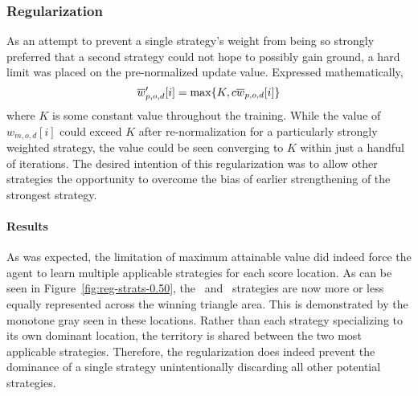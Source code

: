 

\subsubsection*{Regularization}


As an attempt to prevent a single strategy's weight from being so strongly 
preferred that a second strategy could not hope to possibly gain ground,
a hard limit was placed on the pre-normalized update value.
%
Expressed mathematically,
\[
    \overline{w}'_{p,o,d}[i] = \max\{K,c\overline{w}_{p,o,d}[i]\}
\]
where $K$ is some constant value throughout the training.
%
While the value of $w_{m,o,d}[i]$ could exceed $K$ after re-normalization
for a particularly strongly weighted strategy,
the value could be seen converging to $K$ within just a handful of iterations.
%
The desired intention of this regularization was to allow other strategies
the opportunity to overcome the bias of earlier strengthening of the strongest
strategy.

\paragraph*{Results}



%
%



As was expected,
the limitation of maximum attainable value did indeed force the agent to learn
multiple applicable strategies for each score location.
%
As can be seen in Figure~\ref{fig:reg-strats-0.50},
the \handmaxmin\ and \handmaxavg\ strategies are now 
more or less equally represented across the winning triangle area.
%
This is demonstrated by the monotone gray seen in these locations.
%
Rather than each strategy specializing to its own dominant location,
the territory is shared between the two most applicable strategies.
%
Therefore,
the regularization does indeed prevent the dominance of a single strategy
unintentionally discarding all other potential strategies.

